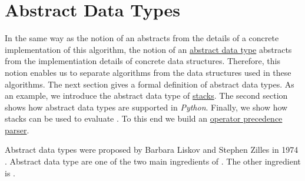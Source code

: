\chapter{Abstract Data Types}
In the same way as the notion of an  abstracts from the details of a concrete
implementation of this algorithm, the notion of an \href{https://en.wikipedia.org/wiki/Abstract_data_type}{abstract data type} abstracts from the implementiation
details of concrete data structures.  Therefore, this notion enables us to separate algorithms from the data
structures used in these algorithms.  The next section gives a formal definition of
abstract data types.  As an example, we introduce the abstract data type of
\href{https://en.wikipedia.org/wiki/Stack_(abstract_data_type)}{stacks}.
The second section shows how abstract data types are supported in \textsl{Python}.  Finally, we show how stacks can be used
to evaluate .  To this end we build an
\href{https://en.wikipedia.org/wiki/Operator-precedence_parser}{operator precedence parser}. 

Abstract data types were proposed by Barbara Liskov and Stephen
Zilles in 1974 \cite{liskov:1974}.  Abstract data type are one of the two main ingredients of
.  The other ingredient is .

